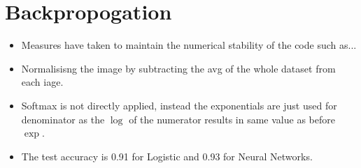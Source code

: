 \documentclass[a4paper,11pt]{article}
\begin{document}
\section*{Backpropogation}
\begin{itemize}
	\item Measures have taken to maintain the numerical stability of the code such as...
	\item Normalisisng the image by subtracting the avg of the whole dataset from each iage.
	\item Softmax is not directly applied, instead the exponentials are just used for denominator as the $\log$ of the numerator results in same value as before $\exp$.
	\item The test accuracy is 0.91 for Logistic and 0.93 for Neural Networks.
\end{itemize}
\end{document}
